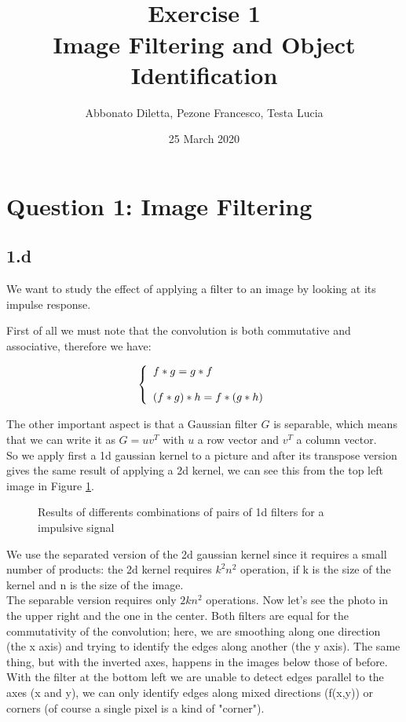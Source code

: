\documentclass{article}
\title{\BIG{Advanced Machine Learning} \\
Exercise 1 \\ Image Filtering and Object Identiﬁcation}
\author{Abbonato Diletta, Pezone Francesco, Testa Lucia}
\date{25 March 2020}
\begin{document}
\maketitle
\newpage
\section{Question 1: Image Filtering }

\subsection{1.d} \label{1.d}
 
We want to study the effect of applying a filter to an image by looking at its impulse response.

First of all we must note that the convolution is both  commutative and associative, therefore we have:

\begin{equation}
\centering
\left\{\begin{array}{l} f * g =g * f \\ \\ (f*g)*h = f*(g*h)\end{array}\right.
\label{numero alberi}
\end{equation}

The other important aspect is that a Gaussian filter $G$ is separable, which means that we can write it as $G = uv^T$ with $u$ a row vector and $v^T$ a column vector.\\
So we apply first a 1d gaussian kernel to a picture and after its transpose version gives the same result of applying a 2d kernel, we can see this from the top left image in Figure \ref{all_filt_gauss}.

\begin{figure}[!h]
    \centering
	\mbox{}
	\caption{Results of differents combinations of pairs of 1d filters for a impulsive signal}
	\label{all_filt_gauss}
\end{figure}

We use the separated version of the 2d gaussian kernel since it requires a small number of products: the 2d kernel requires
$k^2 n^2$ operation, if k is the size of the kernel and n is the size of the image.\\
The separable version requires
only $2kn^2$ operations.
Now let's see the photo in the upper right and the one in the center. Both filters are equal for the commutativity of the convolution; here, we are smoothing along one direction (the x axis) and trying to identify the edges along another (the y axis). The same thing, but with the inverted axes, happens in the images below those of before.\\
With the filter at the bottom left we are unable to detect edges parallel to the axes (x and y), we can only identify edges along mixed directions (f(x,y)) or corners (of course a single pixel is a kind of "corner").
\newpage
\end{document}
